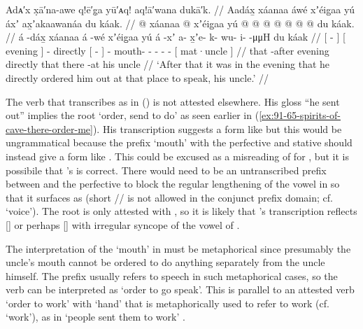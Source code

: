 \ex\label{ex:91-77-order-to-speak-outside}%
%
\begingl
	\glpreamble	Adᴀ′x x̣ā′na-awe q!ē′g̣a yū′ᴀq! aq!ā′wana dukā′k. //
	\glpreamble	Aadáx̱ xáanaa áwé xʼéig̱aa yú áxʼ ax̱ʼakaawanáa du káak. //
	\gla	{}  @ {} {} {} xáanaa {}  @ {}
		xʼéig̱aa {} yú  @ {} {}
		 @ {} @ {} @ {} @ {} @ {} @ {}
		{} du káak. {} //
	\glb	{} á -dáx̱ {} {} xáanaa {} á -wé
		xʼéig̱aa {} yú á -xʼ {}
		a- x̱ʼe- k- wu- i-  -μμH
		{} du káak {}  //
	\glc	{}[  - {}] {}[ evening {}]  -
		directly {}[   - {}]
		- mouth- - - -  -
		{}[  mat·uncle {}] //
	\gld	{} that -after {} {} evening {}  {}
		directly {} that there -at {}
		 {} {} {} {} {} {}
		{} his uncle {}  //
	\glft	‘After that it was in the evening that he directly ordered him out at that place to speak, his uncle.’
		//
\endgl
\xe

The verb that \citeauthor{swanton:1909} transcribes as  in (\lastx) is not attested elsewhere.
His gloss “he sent out” implies the root  ‘order, send to do’ as seen earlier in (\ref{ex:91-65-spirits-of-cave-there-order-me}).
His transcription suggests a form like  but this would be ungrammatical because the prefix  ‘mouth’ with the perfective  and stative  should instead give a form like .
This could be excused as a misreading of  for , but it is possibile that \citeauthor{swanton:1909}’s  is correct.
There would need to be an untranscribed prefix between  and the perfective  to block the regular lengthening of the vowel in  so that it surfaces as  (short // is not allowed in the conjunct prefix domain; cf.
 ‘voice’).
The root  is only attested with  \parencites[04/23–25]{leer:1973}[249–250]{leer:1976}[16]{leer:1978b}, so it is likely that \citeauthor{swanton:1909}’s transcription  reflects  [] or perhaps  [] with irregular syncope of the vowel of .

The interpretation of the  ‘mouth’ in  must be metaphorical since presumably the uncle’s mouth cannot be ordered to do anything separately from the uncle himself.
The  prefix usually refers to speech in such metaphorical cases, so the verb can be interpreted as ‘order to go speak’.
This is parallel to an attested verb  ‘order to work’ with  ‘hand’ that is metaphorically used to refer to work (cf.\  ‘work’), as in  ‘people sent them to work’ \parencite[143.1936]{story-naish:1973}.

